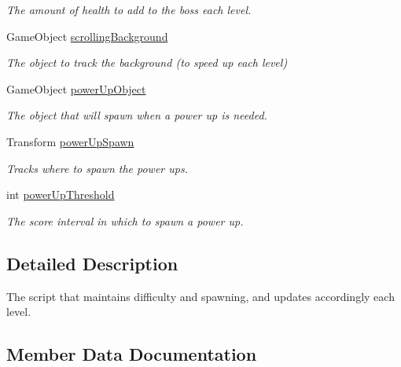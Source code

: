 \begin{DoxyCompactItemize}
\begin{DoxyCompactList}\small\item\em The amount of health to add to the boss each level. \end{DoxyCompactList}\item 
Game\+Object \mbox{\hyperlink{class_level_controller_a09cc9c55bc33be5c9c9861f1291f2070}{scrolling\+Background}}
\begin{DoxyCompactList}\small\item\em The object to track the background (to speed up each level) \end{DoxyCompactList}\item 
Game\+Object \mbox{\hyperlink{class_level_controller_a99291eb24ff2d4f118ae35100ba238d2}{power\+Up\+Object}}
\begin{DoxyCompactList}\small\item\em The object that will spawn when a power up is needed. \end{DoxyCompactList}\item 
Transform \mbox{\hyperlink{class_level_controller_a9d1d63a7deb1d44661820a73b806c9bf}{power\+Up\+Spawn}}
\begin{DoxyCompactList}\small\item\em Tracks where to spawn the power ups. \end{DoxyCompactList}\item 
int \mbox{\hyperlink{class_level_controller_a4cde6e70afc6404160a2950fa82d3569}{power\+Up\+Threshold}}
\begin{DoxyCompactList}\small\item\em The score interval in which to spawn a power up. \end{DoxyCompactList}\end{DoxyCompactItemize}


\subsection{Detailed Description}
The script that maintains difficulty and spawning, and updates accordingly each level. 

\subsection{Member Data Documentation}
\mbox{\label{class_level_controller_aba68593c9e9aa85e67d95232aa91ad0b}} 
